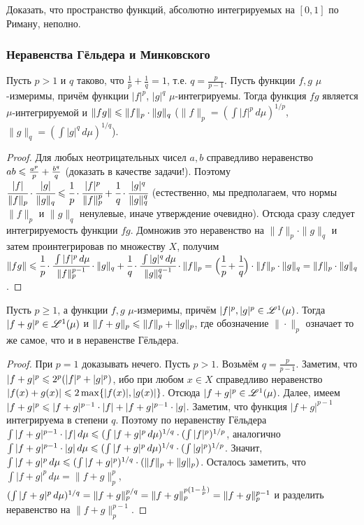 \documentclass[10pt]{article}
\begin{document}
\begin{problem}
Доказать, что пространство функций, абсолютно интегрируемых на
$[0,1]$ по Риману, неполно.
\end{problem}

\subsubsection{Неравенства Гёльдера и Минковского}

\begin{theorem}
Пусть $p>1$ и $q$ таково, что $\frac1p+\frac1q=1$, т.е.
$q=\frac{p}{p-1}$. Пусть функции $f,g$ $\mu$-измеримы, причём
функции $|f|^p$, $|g|^q$ $\mu$-интегрируемы. Тогда функция $fg$
является $\mu$-интегрируемой и $\|fg\|\bw\le\|f\|_p\cdot\|g\|_q$
{\upshape($\|f\|_p=\left(\int|f|^p\,d\mu\right)^{1/p}$,
$\|g\|_q=\left(\int|g|^q\,d\mu\right)^{1/q}$)}.
\end{theorem}

\begin{proof}
Для любых неотрицательных чисел $a,b$ справедливо неравенство $ab\bw
\le\frac{a^p}p+\frac{b^q}q$ (доказать в качестве задачи!). Поэтому
$\cfrac{|f|}{\|f\|_p}\cdot\cfrac{|g|}{\|g\|_q}\bw \le\cfrac1p
\cdot\cfrac{|f|^p}{\|f\|_p^p}\bw
+\cfrac1q\cdot\cfrac{|g|^q}{\|g\|_q^q}$ (естественно, мы
предполагаем, что нормы $\|f\|_p$ и $\|g\|_q$ ненулевые, иначе
утверждение очевидно). Отсюда сразу следует интегрируемость функции
$fg$. Домножив это неравенство на $\|f\|_p\cdot\|g\|_q$ и затем
проинтегрировав по множеству $X$, получим $\|fg\|\bw
\le\cfrac1p\cdot\cfrac{\int|f|^p\,d\mu}{\|f\|_p^{p-1}}
\cdot\|g\|_q\bw +\cfrac1q \cdot
\cfrac{\int|g|^q\,d\mu}{\|g\|_q^{q-1}} \cdot\|f\|_p\bw
=\Br{\cfrac1p\bw +\cfrac1q}\cdot\|f\|_p\cdot\|g\|_q\bw
=\|f\|_p\cdot\|g\|_q$.
\end{proof}

\begin{theorem}
Пусть $p\ge1$, а функции $f,g$ $\mu$-измеримы, причём
$|f|^p,|g|^p\bw \in \Ls^1(\mu)$. Тогда $|f+g|^p\bw \in \Ls^1(\mu)$ и
$\|f+g\|_p\bw \le\|f\|_p+\|g\|_p$, где обозначение $\|\cdot\|_p$
означает то же самое, что и в неравенстве Гёльдера.
\end{theorem}

\begin{proof}
При $p=1$ доказывать нечего. Пусть $p>1$. Возьмём $q=\frac{p}{p-1}$.
Заметим, что $|f+g|^p\bw \le2^p(|f|^p+|g|^p)$, ибо при любом $x\in
X$ справедливо неравенство $|f(x)+g(x)|\bw
\le2\max\{|f(x)|,|g(x)|\}$. Отсюда $|f+g|^p\in \mathscr{L}^1(\mu)$. Далее,
имеем $|f+g|^p\bw\le|f+g|^{p-1}\cdot|f|\bw +|f+g|^{p-1}\cdot|g|$.
Заметим, что функция $|f+g|^{p-1}$ интегрируема в степени $q$.
Поэтому по неравенству Гёльдера $\int|f+g|^{p-1}\cdot|f|\,d\mu\bw
\le(\int|f+g|^p\,d\mu)^{1/q}\cdot(\int|f|^p)^{1/p}$, аналогично
$\int|f+g|^{p-1}\cdot|g|\,d\mu\bw
\le(\int|f+g|^p\,d\mu)^{1/q}\cdot(\int|g|^p)^{1/p}$. Значит,
$\int|f+g|^p\,d\mu\bw \le(\int|f+g|^p)^{1/q}\cdot(\|f\|_p\bw
+\|g\|_p)$. Осталось заметить, что $\int|f+g|^p\,d\mu=\|f+g\|_p^p$,
$(\int|f+g|^p\,d\mu)^{1/q}\bw
=\|f+g\|_p^{p/q}=\|f+g\|_p^{p(1-\frac1p)}\bw =\|f+g\|_p^{p-1}$ и
разделить неравенство на $\|f+g\|_p^{p-1}$.
\end{proof}
\end{document}
